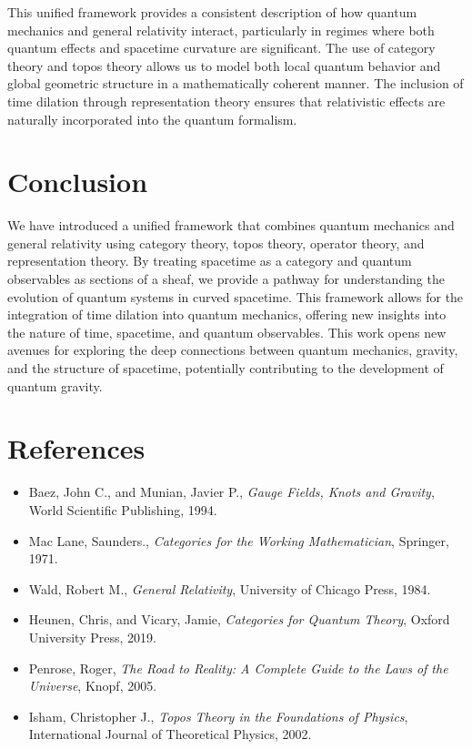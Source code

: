 \documentclass{article}
\begin{document}
This unified framework provides a consistent description of how quantum mechanics and general relativity interact, particularly in regimes where both quantum effects and spacetime curvature are significant. The use of category theory and topos theory allows us to model both local quantum behavior and global geometric structure in a mathematically coherent manner. The inclusion of time dilation through representation theory ensures that relativistic effects are naturally incorporated into the quantum formalism.

\section{Conclusion}

We have introduced a unified framework that combines quantum mechanics and general relativity using category theory, topos theory, operator theory, and representation theory. By treating spacetime as a category and quantum observables as sections of a sheaf, we provide a pathway for understanding the evolution of quantum systems in curved spacetime. This framework allows for the integration of time dilation into quantum mechanics, offering new insights into the nature of time, spacetime, and quantum observables. This work opens new avenues for exploring the deep connections between quantum mechanics, gravity, and the structure of spacetime, potentially contributing to the development of quantum gravity.

\section{References}

\begin{itemize}
    \item Baez, John C., and Munian, Javier P., \textit{Gauge Fields, Knots and Gravity}, World Scientific Publishing, 1994.
    \item Mac Lane, Saunders., \textit{Categories for the Working Mathematician}, Springer, 1971.
    \item Wald, Robert M., \textit{General Relativity}, University of Chicago Press, 1984.
    \item Heunen, Chris, and Vicary, Jamie, \textit{Categories for Quantum Theory}, Oxford University Press, 2019.
    \item Penrose, Roger, \textit{The Road to Reality: A Complete Guide to the Laws of the Universe}, Knopf, 2005.
    \item Isham, Christopher J., \textit{Topos Theory in the Foundations of Physics}, International Journal of Theoretical Physics, 2002.
\end{itemize}
\end{document}
